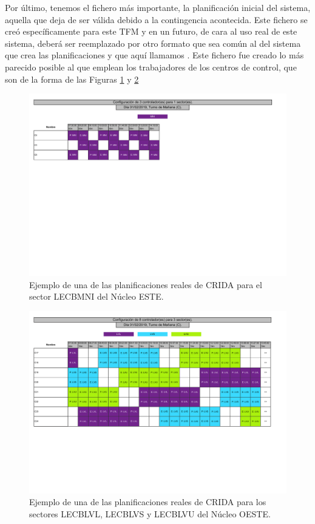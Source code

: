Por último, tenemos el fichero más importante, la planificación inicial del sistema, aquella que deja de ser válida debido a la contingencia acontecida. Este fichero se creó específicamente para este TFM y en un futuro, de cara al uso real de este sistema, deberá ser reemplazado por otro formato que sea común al del sistema que crea las planificaciones y que aquí llamamos \legacy{}. Este fichero fue creado lo más parecido posible al que emplean los trabajadores de los centros de control, que son de la forma de las Figuras \ref{fig:A:ejemplo-distribucion-crida-1} y \ref{fig:A:ejemplo-distribucion-crida-2}

\begin{figure}
	\centering
	\includegraphics[width=\linewidth]{anexos/AnexoA-Formato-Planificacion-Inicial/recursos/ejemplo-distribucion-crida-1}
	\caption{Ejemplo de una de las planificaciones reales de CRIDA para el sector LECBMNI del Núcleo ESTE.}
	\label{fig:A:ejemplo-distribucion-crida-1}
\end{figure}

\begin{figure}
	\centering
	\includegraphics[width=\linewidth]{anexos/AnexoA-Formato-Planificacion-Inicial/recursos/ejemplo-distribucion-crida-2}
	\caption{Ejemplo de una de las planificaciones reales de CRIDA para los sectores LECBLVL, LECBLVS y LECBLVU del Núcleo OESTE.}
	\label{fig:A:ejemplo-distribucion-crida-2}
\end{figure}

